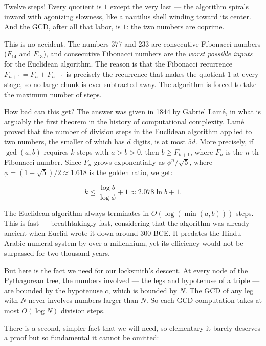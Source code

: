 \documentclass[11pt,openright,twoside]{book}
\theoremstyle{definition}
\begin{document}
Twelve steps! Every quotient is $1$ except the very last --- the algorithm spirals inward with agonizing slowness, like a nautilus shell winding toward its center. And the GCD, after all that labor, is $1$: the two numbers are coprime.

This is no accident. The numbers $377$ and $233$ are consecutive Fibonacci numbers ($F_{14}$ and $F_{13}$), and consecutive Fibonacci numbers are the \textit{worst possible inputs} for the Euclidean algorithm. The reason is that the Fibonacci recurrence $F_{n+1} = F_n + F_{n-1}$ is precisely the recurrence that makes the quotient $1$ at every stage, so no large chunk is ever subtracted away. The algorithm is forced to take the maximum number of steps.

How bad can this get? The answer was given in 1844 by Gabriel Lamé, in what is arguably the first theorem in the history of computational complexity. Lamé proved that the number of division steps in the Euclidean algorithm applied to two numbers, the smaller of which has $d$ digits, is at most $5d$. More precisely, if $\gcd(a, b)$ requires $k$ steps with $a > b > 0$, then $b \ge F_{k+1}$, where $F_n$ is the $n$-th Fibonacci number. Since $F_n$ grows exponentially as $\phi^n / \sqrt{5}$, where $\phi = (1 + \sqrt{5})/2 \approx 1.618$ is the golden ratio, we get:

\[k \le \frac{\log b}{\log \phi} + 1 \approx 2.078 \ln b + 1.\]

The Euclidean algorithm always terminates in $O(\log(\min(a, b)))$ steps. This is fast --- breathtakingly fast, considering that the algorithm was already ancient when Euclid wrote it down around 300 BCE. It predates the Hindu-Arabic numeral system by over a millennium, yet its efficiency would not be surpassed for two thousand years.

But here is the fact we need for our locksmith's descent. At every node of the Pythagorean tree, the numbers involved --- the legs and hypotenuse of a triple --- are bounded by the hypotenuse $c$, which is bounded by $N$. The GCD of any leg with $N$ never involves numbers larger than $N$. So each GCD computation takes at most $O(\log N)$ division steps.

There is a second, simpler fact that we will need, so elementary it barely deserves a proof but so fundamental it cannot be omitted:
\end{document}

